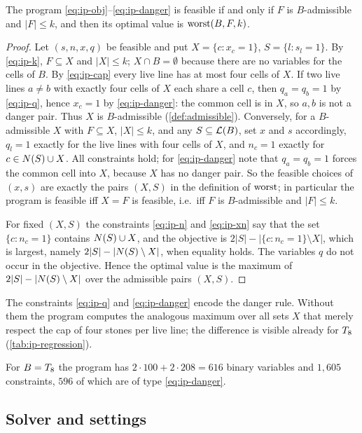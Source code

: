 \begin{proposition}\label{prop:ip-exact}
The program \eqref{eq:ip-obj}--\eqref{eq:ip-danger} is feasible if and only if $F$ is $B$-admissible and
$|F|\le k$, and then its optimal value is $\operatorname{worst}(B,F,k)$.
\end{proposition}

\begin{proof}
Let $(s,n,x,q)$ be feasible and put $X=\{c:x_c=1\}$, $S=\{l:s_l=1\}$. By \eqref{eq:ip-k}, $F\subseteq X$ and
$|X|\le k$; $X\cap B=\emptyset$ because there are no variables for the cells of $B$. By \eqref{eq:ip-cap}
every live line has at most four cells of $X$. If two live lines $a\ne b$ with exactly four cells of $X$
each share a cell $c$, then $q_a=q_b=1$ by \eqref{eq:ip-q}, hence $x_c=1$ by \eqref{eq:ip-danger}: the
common cell is in $X$, so $a,b$ is not a danger pair. Thus $X$ is $B$-admissible (\cref{def:admissible}).
Conversely, for a $B$-admissible $X$ with $F\subseteq X$, $|X|\le k$, and any $S\subseteq\mathcal{L}(B)$, set $x$ and
$s$ accordingly, $q_l=1$ exactly for the live lines with four cells of $X$, and $n_c=1$ exactly for
$c\in N(S)\cup X$. All constraints hold; for \eqref{eq:ip-danger} note that $q_a=q_b=1$ forces the common
cell into $X$, because $X$ has no danger pair. So the feasible choices of $(x,s)$ are exactly the pairs
$(X,S)$ in the definition of $\operatorname{worst}$; in particular the program is feasible iff $X=F$ is feasible, i.e.\ iff
$F$ is $B$-admissible and $|F|\le k$.

For fixed $(X,S)$ the constraints \eqref{eq:ip-n} and \eqref{eq:ip-xn} say that the set $\{c:n_c=1\}$
contains $N(S)\cup X$, and the objective is $2|S|-|\{c:n_c=1\}\setminus X|$, which is largest, namely
$2|S|-|N(S)\setminus X|$, when equality holds. The variables $q$ do not occur in the objective. Hence the
optimal value is the maximum of $2|S|-|N(S)\setminus X|$ over the admissible pairs $(X,S)$.
\end{proof}

The constraints \eqref{eq:ip-q} and \eqref{eq:ip-danger} encode the danger rule. Without them the
program computes the analogous maximum over all sets $X$ that merely respect the cap of four stones per
live line; the difference is visible already for $T_8$ (\cref{tab:ip-regression}).

For $B=T_8$ the program has $2\cdot100+2\cdot208=616$ binary variables and $1{,}605$ constraints, $596$
of which are of type \eqref{eq:ip-danger}.

\subsection{Solver and settings}\label{ssec:ip-solver}


